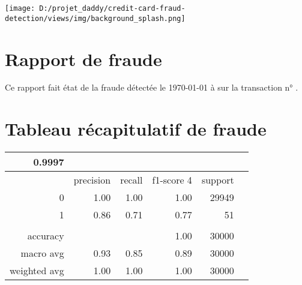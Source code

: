 \documentclass[10pt,a4paper]{article}
\newcommand{\dice}{\rand\arabic{rand}}
\begin{document}
\begin{center}
\texttt{[image: D:/projet\_daddy/credit-card-fraud-detection/views/img/background\_splash.png]} 
\end{center}
\section{Rapport de fraude}
\flushleft
\bigbreak  
\bigbreak  
Ce rapport fait état de la fraude détectée   le \today{}  à  \DTMcurrenttime{} sur la transaction n°\dice \dice {}  .
\bigbreak  
\bigbreak  
\bigbreak  
\bigbreak  
\bigbreak  
\bigbreak  
\bigbreak  
\section{Tableau récapitulatif de fraude}
\flushleft
\bigbreak  
\bigbreak  
\begin{center}
\begin{tabular}{| r | r | r | r | r | r | }
\hline
0.9997 & & & &\\
\hline
 & precision & recall & f1-score 4 & support\\
\hline
0 & 1.00 & 1.00 & 1.00 & 29949 \\
\hline
1 & 0.86 & 0.71 & 0.77 & 51\\
\hline
& & & &\\
\hline
accuracy &  & & 1.00 & 30000\\
\hline
macro avg & 0.93 & 0.85 & 0.89 & 30000\\
\hline
weighted avg & 1.00 & 1.00 & 1.00 & 30000\\
\hline

\end{tabular}
\end{center}
\end{document}

